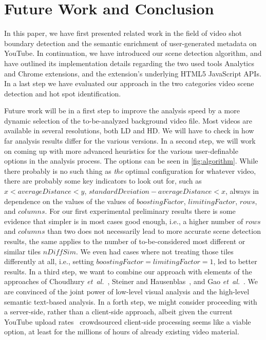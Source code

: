 \documentclass[10pt,twocolumn,letterpaper]{article}
\begin{document}
\section{Future Work and Conclusion} \label{sec:future-work-conclusion}
In this paper, we have first presented related work in the field of video shot boundary detection and the semantic enrichment of user-generated metadata on YouTube. In continuation, we have introduced our scene detection algorithm, and have outlined its implementation details regarding the two used tools Analytics and Chrome extensions, and the extension's underlying HTML5 JavaScript APIs. In a last step we have evaluated our approach in the two categories video scene detection and hot spot identification.

Future work will be in a first step to improve the analysis speed by a more dynamic selection of the to-be-analyzed background video file. Most videos are available in several resolutions, both LD and HD. We will have to check in how far analysis results differ for the various versions. In a second step, we will work on coming up with more advanced heuristics for the various user-definable options in the analysis process. The options can be seen in \autoref{fig:algorithm}. While there probably is no such thing as \emph{the} optimal configuration for whatever video, there are probably some key indicators to look out for, such as $x < averageDistance  < y$, $standardDeviation - averageDistance < x$, always in dependence on the values of the values of $boostingFactor$, $limitingFactor$, $rows$, and $columns$. For our first experimental preliminary results there is some evidence that simpler is in most cases good enough, i.e., a higher number of $rows$ and $columns$ than two does not necessarily lead to more accurate scene detection results, the same applies to the number of to-be-considered most different or similar tiles $nDiffSim$. We even had cases where not treating those tiles differently at all, i.e., setting $boostingFactor  = limitingFactor = 1$, led to better results. In a third step, we want to combine our approach with elements of the approaches of Choudhury \emph{et~al.}~\cite{Choudhury:YouTube}, Steiner and Hausenblas~\cite{semwebvid}, and Gao \emph{et~al.}~\cite{Gao:2009}. We are convinced of the joint power of low-level visual analysis and the high-level semantic text-based analysis. In a forth step, we might consider proceeding with a server-side, rather than a client-side approach, albeit given the current YouTube upload rates~\cite{youtube:stats} crowdsourced client-side processing seems like a viable option, at least for the millions of hours of already existing video material.
\end{document}
